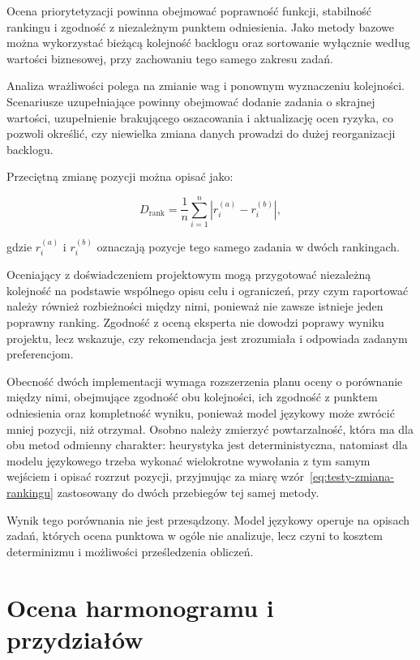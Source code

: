 Ocena priorytetyzacji powinna obejmować poprawność funkcji, stabilność rankingu i zgodność z niezależnym punktem odniesienia. Jako metody bazowe można wykorzystać bieżącą kolejność backlogu oraz sortowanie wyłącznie według wartości biznesowej, przy zachowaniu tego samego zakresu zadań.

Analiza wrażliwości polega na zmianie wag i ponownym wyznaczeniu kolejności. Scenariusze uzupełniające powinny obejmować dodanie zadania o skrajnej wartości, uzupełnienie brakującego oszacowania i aktualizację ocen ryzyka, co pozwoli określić, czy niewielka zmiana danych prowadzi do dużej reorganizacji backlogu.

Przeciętną zmianę pozycji można opisać jako:

\begin{equation}
    D_{\mathrm{rank}}
    =
    \frac{1}{n}\sum_{i=1}^{n}
    \left|r_i^{(a)}-r_i^{(b)}\right|,
    \label{eq:testy-zmiana-rankingu}
\end{equation}

gdzie \(r_i^{(a)}\) i \(r_i^{(b)}\) oznaczają pozycje tego samego zadania w dwóch rankingach.

Oceniający z doświadczeniem projektowym mogą przygotować niezależną kolejność na podstawie wspólnego opisu celu i ograniczeń, przy czym raportować należy również rozbieżności między nimi, ponieważ nie zawsze istnieje jeden poprawny ranking. Zgodność z oceną eksperta nie dowodzi poprawy wyniku projektu, lecz wskazuje, czy rekomendacja jest zrozumiała i odpowiada zadanym preferencjom.

Obecność dwóch implementacji wymaga rozszerzenia planu oceny o porównanie między nimi, obejmujące zgodność obu kolejności, ich zgodność z punktem odniesienia oraz kompletność wyniku, ponieważ model językowy może zwrócić mniej pozycji, niż otrzymał. Osobno należy zmierzyć powtarzalność, która ma dla obu metod odmienny charakter: heurystyka jest deterministyczna, natomiast dla modelu językowego trzeba wykonać wielokrotne wywołania z tym samym wejściem i opisać rozrzut pozycji, przyjmując za miarę wzór~\eqref{eq:testy-zmiana-rankingu} zastosowany do dwóch przebiegów tej samej metody.

Wynik tego porównania nie jest przesądzony. Model językowy operuje na opisach zadań, których ocena punktowa w ogóle nie analizuje, lecz czyni to kosztem determinizmu i możliwości prześledzenia obliczeń.

\section{Ocena harmonogramu i przydziałów}

